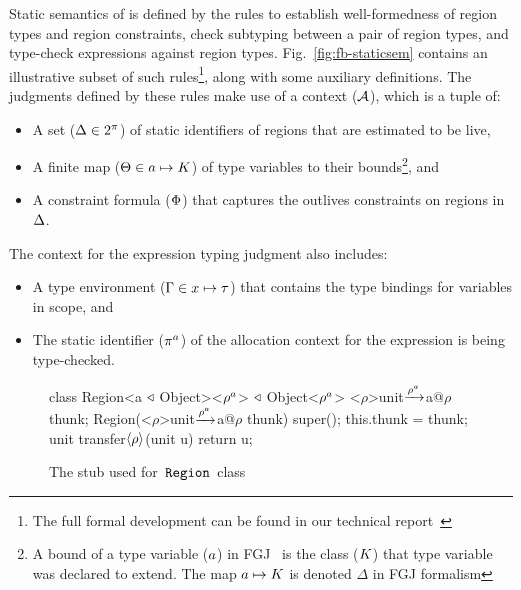 Static semantics of \fbname is defined by the rules to establish
well-formedness of region types and region constraints, check
subtyping between a pair of region types, and type-check expressions
against region types. Fig.~\ref{fig:fb-staticsem} contains an
illustrative subset of such rules\footnote{The full formal development
can be found in our technical report~\cite{techrep}}, along with some
auxiliary definitions. The judgments defined by these rules make use
of a context (${\mathcal{A}}$), which is a tuple of:
\begin{itemize}
\item A set ($\Delta \in 2^\pi$) of static identifiers of regions
that are estimated to be live,
\item A finite map ($\Theta \in a \mapsto K$) of type
variables to their bounds\footnote{A bound of a type variable
($a$) in FGJ~\cite{fgj} is the class ($K$) that type variable
was declared to extend.  The map $a \mapsto K$ is denoted
$\Delta$ in FGJ formalism}, and
\item A constraint formula ($\Phi$) that captures the outlives
constraints on regions in $\Delta$.
\end{itemize}
The context for the expression typing judgment also includes:
\begin{itemize}
\item A type environment ($\Gamma \in x \mapsto \tau$) that contains the
type bindings for variables in scope, and 
\item The static identifier ($\pi^a$) of the allocation context for
the expression is being type-checked.  
\end{itemize}

\begin{figure}

\begin{codejava}
class Region<a $\triangleleft$ Object><${\rho^a}$> $\triangleleft$ Object<$\rho^a$>{
  <${\rho}$>unit$\xrightarrow{\rho^a}$a@$\rho$ thunk;
  Region(<${\rho}$>unit$\xrightarrow{\rho^a}$a@$\rho$ thunk) {
    super(); 
    this.thunk = thunk;
  }
  unit transfer$\langle \rho \rangle$(unit u) {
    return u;
  }
}
\end{codejava}

\caption{The stub used for $\,{\tt Region}\,$ class}
\label{fig:region-stub}
\end{figure}

